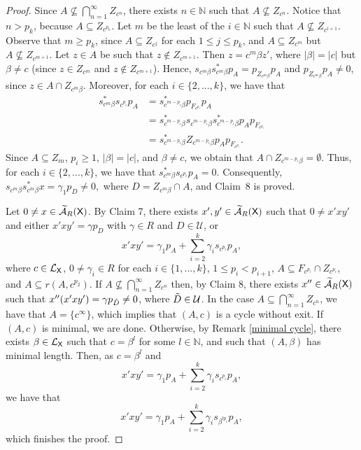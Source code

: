 \documentclass[a4paper,12pt]{amsart}
\theoremstyle{definition}
\theoremstyle{remark}
\numberwithin{equation}{section}
\newcommand{\osf}{{\normalfont \textsf{X}}}
\newcommand{\lang}{\CL_{\osf}}
\newcommand{\ualgshift}{\TCA_R(\osf)}
\newcommand{\N}{\mathbb{N}}
\newcommand{\CA}{\mathcal{A}}
\newcommand{\CL}{\mathcal{L}}
\newcommand{\TCA}{\widetilde{\CA}}
\newcommand{\TCB}{\mathcal{U}}
\begin{document}
\begin{proof}
Since $A\nsubseteq \bigcap\limits_{n=1}^\infty Z_{c^n}$, there exists $n\in \N$ such that $A\nsubseteq Z_{c^n}$. Notice that $n>p_k$, because $A\subseteq Z_{c^{p_k}}$. Let $m$ be the least of the $i\in \N$ such that $A\nsubseteq Z_{c^{i+1}}$. Observe that $m\geq p_k$, since $A\subseteq Z_{c^j}$ for each $1\leq j\leq p_k$, and $A\subseteq Z_{c^m}$ but $A\nsubseteq Z_{c^{m+1}}$. Let $z\in A$ be such that $z\notin Z_{c^{m+1}}$. Then $z=c^m\beta z'$, where $|\beta|=|c|$ but $\beta\neq c$ (since $z\in Z_{c^{m}}$ and $z\notin Z_{c^{m+1}}$).
Hence, $s_{c^m\beta} s_{c^m\beta}^*p_A=p_{Z_{c^m\beta}}p_A$
 and $p_{Z_{c^m\beta}}p_A\neq 0$, since $z\in A\cap Z_{c^m\beta}$.
Moreover, for each $i\in \{2,...,k\}$, we have that
\begin{align*}
s_{c^m\beta}^*s_{c^{p_i}}p_A&=s_{c^{m-p_i}\beta}^*p_{F_{c^{p_i}}}p_A\\
&=s_{c^{m-p_i}\beta}^*s_{c^{m-p_i}\beta}s_{c^{m-p_i}\beta}^*p_Ap_{F_{c^{p_i}}}\\
&=s_{c^{m-p_i}\beta}^*Z_{c^{m-p_i}\beta}p_Ap_{F_{c^{p_i}}}.
\end{align*}
Since $A\subseteq Z_m$, $p_i\geq 1$, $|\beta|=|c|$, and $\beta \neq c$, we obtain that $A\cap Z_{c^{m-p_i}\beta}=\emptyset$. Thus, for each $i\in \{2,...,k\}$, we have that
$s_{c^m\beta}^* s_{c^{p_i}}p_A=0$. Consequently, $s_{c^m\beta}s_{c^m\beta}^* x=\gamma_1 p_D\neq 0,$ where $D=Z_{c^m\beta}\cap A$, and Claim~8 is proved. 

\smallskip



Let $0\neq x\in \ualgshift$. By Claim 7, there exists $x',y'\in \ualgshift$ such that $0\neq x'xy'$ and  either $x'xy'=\gamma p_D$ with $\gamma \in R$ and $D\in \TCB$, or
$$x'xy'=\gamma_1 p_A+\sum\limits_{i=2}^k\gamma_i s_{c^{p_i}}p_A,$$ where $c\in \lang$, $0\neq \gamma_i\in R$ for each $i\in \{1,...,k\}$, $1\leq p_i <p_{i+1}$, $A\subseteq F_{c^{p_i}}\cap Z_{c^{p_i}}$, and  $A\subseteq r(A,c^{p_2})$.
If $A\nsubseteq \bigcap \limits_{n=1}^\infty Z_{c^n}$ then, by Claim 8, there exists $x''\in \ualgshift$ such that $x'' (x'xy')=\gamma p_{\Tilde{D}}\neq 0$, where $\Tilde{D}\in \TCB$. In the case $A\subseteq \bigcap\limits_{n=1}^\infty Z_{c^n}$, we have that $A=\{c^\infty\}$, which implies that $(A,c)$ is a cycle without exit. If $(A,c)$ is minimal, we are done. Otherwise, by Remark \ref{minimal cycle}, there exists $\beta\in \lang$ such that $c=\beta^l$ for some $l\in \N$, and such that $(A,\beta)$ has minimal length. Then, as $c=\beta^l$ and $$x'xy'=\gamma_1 p_A+\sum\limits_{i=2}^k\gamma_i s_{c^{p_i}}p_A,$$ we have that 
$$x'xy'=\gamma_1 p_A+\sum\limits_{i=2}^k\gamma_i s_{\beta^{l p_i}}p_A,$$ which  finishes the proof.
\end{proof}
\end{document}
